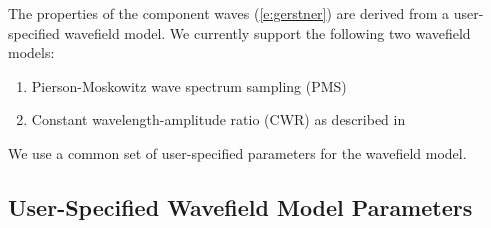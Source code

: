 \documentclass[11pt]{article}
\begin{document}
The properties of the component waves (\ref{e:gerstner}) are derived from a user-specified wavefield model.  We currently support the following two wavefield models:
\begin{enumerate}
\item Pierson-Moskowitz wave spectrum sampling (PMS)
\item Constant wavelength-amplitude ratio (CWR) as described in \cite{gpugems_waves}
\end{enumerate}
We use a common set of user-specified parameters for the wavefield model.

\subsection{User-Specified Wavefield Model Parameters}
\end{document}
